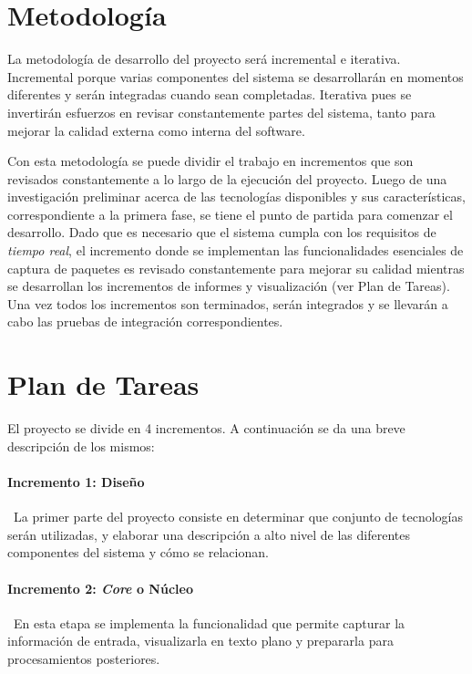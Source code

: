 \section*{Metodología}

La metodología de desarrollo del proyecto será incremental e iterativa. Incremental porque varias componentes del sistema se desarrollarán en momentos diferentes y serán integradas cuando sean completadas. Iterativa pues se invertirán esfuerzos en revisar constantemente partes del sistema, tanto para mejorar la calidad externa como interna del software\cite{ISOIEC9126}.

Con esta metodología se puede dividir el trabajo en incrementos que son revisados constantemente a lo largo de la ejecución del proyecto. Luego de una investigación preliminar acerca de las tecnologías disponibles y sus características, correspondiente a la primera fase, se tiene el punto de partida para comenzar el desarrollo. Dado que es necesario que el sistema cumpla con los requisitos de \textit{tiempo real}, el incremento donde se implementan las funcionalidades esenciales de captura de paquetes es revisado constantemente para mejorar su calidad mientras se desarrollan los incrementos de informes y visualización (ver Plan de Tareas). Una vez todos los incrementos son terminados, serán integrados y se llevarán a cabo las pruebas de integración correspondientes.

\newpage

\section*{Plan de Tareas}

El proyecto se divide en 4 incrementos. A continuación se da una breve descripción de los mismos:

\paragraph{Incremento 1: Diseño}\
La primer parte del proyecto consiste en determinar que conjunto de tecnologías serán utilizadas, y elaborar una descripción a alto nivel de las diferentes componentes del sistema y cómo se relacionan.
\paragraph{Incremento 2: \textit{Core} o Núcleo} \
En esta etapa se implementa la funcionalidad que permite capturar la información de entrada, visualizarla en texto plano y prepararla para procesamientos posteriores.
